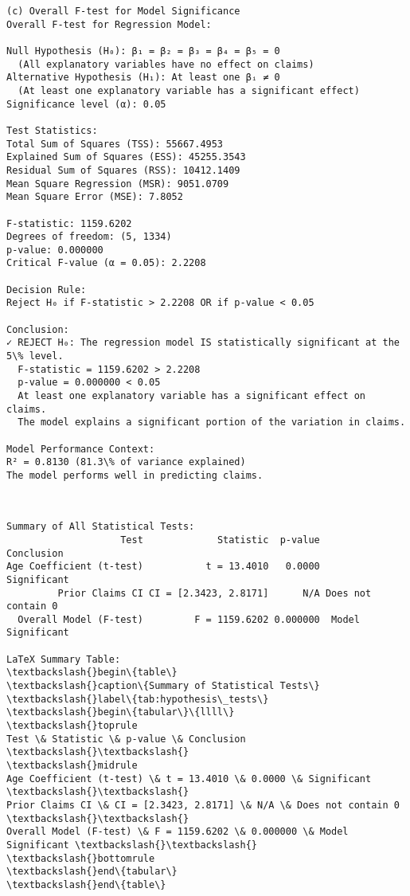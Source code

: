 \documentclass[8pt, twocolumn]{extarticle}
\begin{document}
    \begin{Verbatim}[commandchars=\\\{\}]
(c) Overall F-test for Model Significance
Overall F-test for Regression Model:

Null Hypothesis (H₀): β₁ = β₂ = β₃ = β₄ = β₅ = 0
  (All explanatory variables have no effect on claims)
Alternative Hypothesis (H₁): At least one βᵢ ≠ 0
  (At least one explanatory variable has a significant effect)
Significance level (α): 0.05

Test Statistics:
Total Sum of Squares (TSS): 55667.4953
Explained Sum of Squares (ESS): 45255.3543
Residual Sum of Squares (RSS): 10412.1409
Mean Square Regression (MSR): 9051.0709
Mean Square Error (MSE): 7.8052

F-statistic: 1159.6202
Degrees of freedom: (5, 1334)
p-value: 0.000000
Critical F-value (α = 0.05): 2.2208

Decision Rule:
Reject H₀ if F-statistic > 2.2208 OR if p-value < 0.05

Conclusion:
✓ REJECT H₀: The regression model IS statistically significant at the 5\% level.
  F-statistic = 1159.6202 > 2.2208
  p-value = 0.000000 < 0.05
  At least one explanatory variable has a significant effect on claims.
  The model explains a significant portion of the variation in claims.

Model Performance Context:
R² = 0.8130 (81.3\% of variance explained)
The model performs well in predicting claims.
    \end{Verbatim}
    \begin{center}
    \end{center}
    { \hspace*{\fill} \\}
    \begin{Verbatim}[commandchars=\\\{\}]
Summary of All Statistical Tests:
                    Test             Statistic  p-value         Conclusion
Age Coefficient (t-test)           t = 13.4010   0.0000        Significant
         Prior Claims CI CI = [2.3423, 2.8171]      N/A Does not contain 0
  Overall Model (F-test)         F = 1159.6202 0.000000  Model Significant

LaTeX Summary Table:
\textbackslash{}begin\{table\}
\textbackslash{}caption\{Summary of Statistical Tests\}
\textbackslash{}label\{tab:hypothesis\_tests\}
\textbackslash{}begin\{tabular\}\{llll\}
\textbackslash{}toprule
Test \& Statistic \& p-value \& Conclusion \textbackslash{}\textbackslash{}
\textbackslash{}midrule
Age Coefficient (t-test) \& t = 13.4010 \& 0.0000 \& Significant \textbackslash{}\textbackslash{}
Prior Claims CI \& CI = [2.3423, 2.8171] \& N/A \& Does not contain 0 \textbackslash{}\textbackslash{}
Overall Model (F-test) \& F = 1159.6202 \& 0.000000 \& Model Significant \textbackslash{}\textbackslash{}
\textbackslash{}bottomrule
\textbackslash{}end\{tabular\}
\textbackslash{}end\{table\}
    \end{Verbatim}
\end{document}
